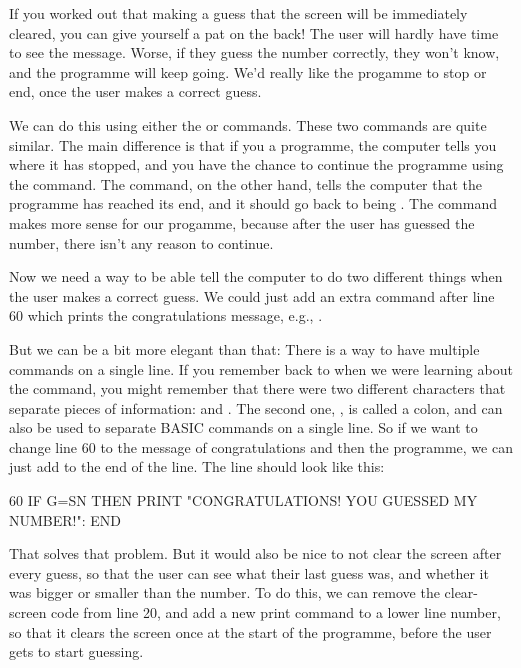 If you worked out that making a guess that the screen will be
immediately cleared, you can give yourself a pat on the back! The user
will hardly have time to see the message. Worse, if they guess the
number correctly, they won't know, and the programme will keep going.
We'd really like the progamme to stop or end, once the user makes a
correct guess.

We can do this using either the  or
 commands.  These two commands are quite similar.  The main
difference is that if you  a programme, the computer tells
you where it has stopped, and you have the chance to continue the
programme using the  command.  The  command, on the
other hand, tells the computer that the programme has reached its end,
and it should go back to being .  The  command
makes more sense for our progamme, because after the user has guessed
the number, there isn't any reason to continue.

Now we need a way to be able tell the computer to do two different
things when the user makes a correct guess. We could just add an extra
 command after line 60 which prints the congratulations
message, e.g., .

But we can be a bit more
elegant than that: There is a way to have multiple commands on a
single line.  If you remember back to when we were learning about the
 command, you might remember that there were two different
characters that separate pieces of information: \stw{,} and
\stw{:}. The second one, \stw{:}, is called a colon, and can also be
used to separate BASIC commands on a single line.  So if we want to
change line 60 to  the message of congratulations and then
 the programme, we can just add  to the end of the
line. The line should look like this:

\begin{screenoutput}
  60 IF G=SN THEN PRINT "CONGRATULATIONS! YOU GUESSED MY NUMBER!": END
\end{screenoutput}

That solves that problem.  But it would also be nice to not clear the
screen after every guess, so that the user can see what their last
guess was, and whether it was bigger or smaller than the number.  To
do this, we can remove the clear-screen code from line 20, and add a
new print command to a lower line number, so that it clears the screen
once at the start of the programme, before the user gets to start
guessing.

